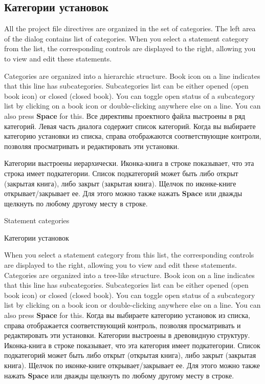 \subsection{Категории установок}
\fi
{}

\ifenglish
All the project file directives are organized in the set of categories.
The left area of the dialog contains list of categories.
When you select a statement category from the list, the corresponding
controls are displayed to the right, allowing you to view and edit
these statements.

Categories are organized into a hierarchic structure.
Book icon on a line indicates that this line has subcategories.
Subcategories list can be either opened (open book icon) or closed (closed book).
You can toggle open status of a subcategory list by clicking on a book icon
or double-clicking anywhere else on a line. You can also press {\bf Space} for this.
\else
Все директивы проектного файла выстроены в ряд категорий.
Левая часть диалога содержит список категорий.
Когда вы выбираете категорию установки из списка, справа отображаются 
соответствующие контроли, позволяя просматривать и редактировать эти установки.

Категории выстроены иерархически. 
Иконка-книга в строке показывает, что эта строка имеет подкатегории.
Список подкатегорий может быть либо открыт (закрытая книга), либо закрыт
(закрытая книга). Щелчок по иконке-книге открывает/закрывает ее. Для этого
можно также нажать {\bf Space} или дважды щелкнуть по любому другому месту в 
строке.
\fi

\begin{popup}
\ifenglish
\caption{Statement categories}
\else
\caption{Категории установок}
\fi
{}

\ifenglish
When you select a statement category from this list, the corresponding
controls are displayed to the right, allowing you to view and edit
these statements. Categories are organized into a tree-like structure.
Book icon on a line indicates that this line has subcategories.
Subcategories list can be either opened (open book icon) or closed (closed book).
You can toggle open status of a subcategory list by clicking on a book icon
or double-clicking anywhere else on a line. You can also press {\bf Space} for this.
\else
Когда вы выбираете категорию установок из списка, справа отображается 
соответствующий контроль, позволяя просматривать и редактировать эти установки.
Категории выстроены в древовидную структуру. Иконка-книга в строке показывает,
что эта категория имеет подкатегории. Список подкатегорий может быть либо открыт
(открытая книга), либо закрыт (закрытая книга). Щелчок по иконке-книге 
открывает/закрывает ее. Для этого можно также нажать {\bf Space} или дважды 
щелкнуть по любому другому месту в строке.
\fi
\end{popup}

